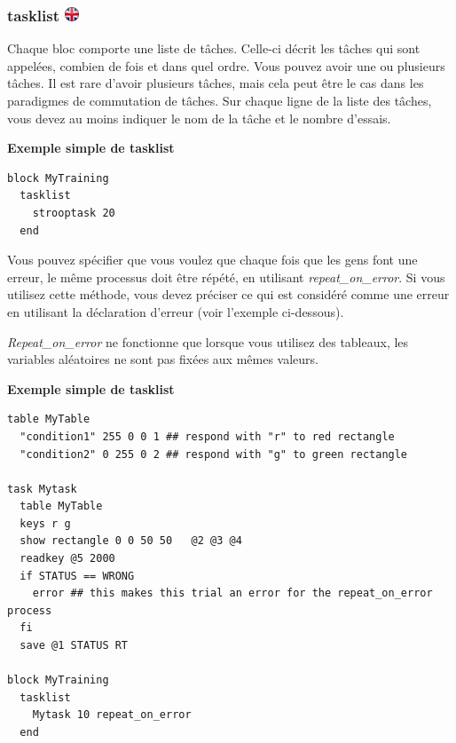 \documentclass[
]{book}
\begin{document}
\hypertarget{tasklist}{%
\subsubsection[tasklist ]{\texorpdfstring{tasklist
\href{https://www.psytoolkit.org/doc3.2.0/syntax.html\#block-tasklist}{\protect\includegraphics{img/ukflag.png}}}{tasklist }}\label{tasklist}}

Chaque bloc comporte une liste de tâches. Celle-ci décrit les tâches qui
sont appelées, combien de fois et dans quel ordre. Vous pouvez avoir une
ou plusieurs tâches. Il est rare d'avoir plusieurs tâches, mais cela
peut être le cas dans les paradigmes de commutation de tâches. Sur
chaque ligne de la liste des tâches, vous devez au moins indiquer le nom
de la tâche et le nombre d'essais.

\textbf{Exemple simple de tasklist}

\begin{verbatim}
block MyTraining
  tasklist
    strooptask 20
  end
\end{verbatim}

Vous pouvez spécifier que vous voulez que chaque fois que les gens font
une erreur, le même processus doit être répété, en utilisant
\emph{repeat\_on\_error}. Si vous utilisez cette méthode, vous devez
préciser ce qui est considéré comme une erreur en utilisant la
déclaration d'erreur (voir l'exemple ci-dessous).

\emph{Repeat\_on\_error} ne fonctionne que lorsque vous utilisez des
tableaux, les variables aléatoires ne sont pas fixées aux mêmes valeurs.

\textbf{Exemple simple de tasklist}

\begin{verbatim}
table MyTable
  "condition1" 255 0 0 1 ## respond with "r" to red rectangle
  "condition2" 0 255 0 2 ## respond with "g" to green rectangle

task Mytask
  table MyTable
  keys r g
  show rectangle 0 0 50 50   @2 @3 @4
  readkey @5 2000
  if STATUS == WRONG
    error ## this makes this trial an error for the repeat_on_error process
  fi
  save @1 STATUS RT

block MyTraining
  tasklist
    Mytask 10 repeat_on_error
  end
\end{verbatim}
\end{document}
